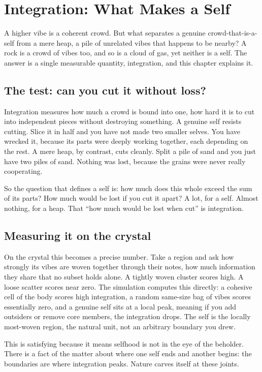 \section{Integration: What Makes a Self}

A higher vibe is a coherent crowd. But what separates a genuine crowd-that-is-a-self from a mere heap, a pile of unrelated vibes that happens to be nearby? A rock is a crowd of vibes too, and so is a cloud of gas, yet neither is a self. The answer is a single measurable quantity, integration, and this chapter explains it.

\subsection{The test: can you cut it without loss?}

Integration measures how much a crowd is bound into one, how hard it is to cut into independent pieces without destroying something. A genuine self resists cutting. Slice it in half and you have not made two smaller selves. You have wrecked it, because its parts were deeply working together, each depending on the rest. A mere heap, by contrast, cuts cleanly. Split a pile of sand and you just have two piles of sand. Nothing was lost, because the grains were never really cooperating.

So the question that defines a self is: how much does this whole exceed the sum of its parts? How much would be lost if you cut it apart? A lot, for a self. Almost nothing, for a heap. That ``how much would be lost when cut'' is integration.

\subsection{Measuring it on the crystal}

On the crystal this becomes a precise number. Take a region and ask how strongly its vibes are woven together through their notes, how much information they share that no subset holds alone. A tightly woven cluster scores high. A loose scatter scores near zero. The simulation computes this directly: a cohesive cell of the body scores high integration, a random same-size bag of vibes scores essentially zero, and a genuine self sits at a local peak, meaning if you add outsiders or remove core members, the integration drops. The self is the locally most-woven region, the natural unit, not an arbitrary boundary you drew.

This is satisfying because it means selfhood is not in the eye of the beholder. There is a fact of the matter about where one self ends and another begins: the boundaries are where integration peaks. Nature carves itself at these joints.

